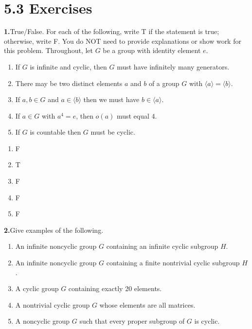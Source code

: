 \documentclass[10pt,]{book}
\theoremstyle{plain}
\theoremstyle{definition}
\theoremstyle{definition}
\theoremstyle{definition}
\theoremstyle{definition}
\numberwithin{equation}{section}
\begin{document}
\section*{5.3 Exercises}
\noindent\textbf{1.}\quad{}True/False. For each of the following, write T if the statement is true; otherwise, write F. You do NOT need to provide explanations or show work for this problem. Throughout, let \(G\) be a group with identity element \(e\). \leavevmode%
\begin{enumerate}[label=(\alph*)]
\item\hypertarget{li-266}{}If \(G\) is infinite and cyclic, then \(G\) must have infinitely many generators.%
\item\hypertarget{li-267}{}There may be two distinct elements \(a\) and \(b\) of a group \(G\) with \(\langle a\rangle =\langle b\rangle\).%
\item\hypertarget{li-268}{}If \(a,b\in G\) and \(a\in \langle b\rangle\) then we must have \(b\in \langle a\rangle\).%
\item\hypertarget{li-269}{}If \(a\in G\) with \(a^4=e\), then \(o(a)\) must equal \(4\).%
\item\hypertarget{li-270}{}If \(G\) is countable then \(G\) must be cyclic.%
\end{enumerate}
%
\par\smallskip
\leavevmode%
\begin{multicols}{5}
\begin{enumerate}[label=(\alph*)]
\item\hypertarget{li-271}{}F%
\item\hypertarget{li-272}{}T%
\item\hypertarget{li-273}{}F%
\item\hypertarget{li-274}{}F%
\item\hypertarget{li-275}{}F%
\end{enumerate}
\end{multicols}
\par\smallskip
\noindent\textbf{2.}\quad{}Give examples of the following. \leavevmode%
\begin{enumerate}[label=(\alph*)]
\item\hypertarget{li-276}{}An infinite noncyclic group \(G\) containing an infinite cyclic subgroup \(H\).%
\item\hypertarget{li-277}{}An infinite noncyclic group \(G\) containing a finite nontrivial cyclic subgroup \(H\).%
\item\hypertarget{li-278}{}A cyclic group \(G\) containing exactly 20 elements.%
\item\hypertarget{li-279}{}A nontrivial cyclic group \(G\) whose elements are all matrices.%
\item\hypertarget{li-280}{}A noncyclic group \(G\) such that every proper subgroup of \(G\) is cyclic.%
\end{enumerate}
\end{document}
